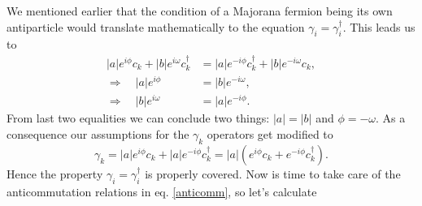 We mentioned earlier that the condition of a Majorana fermion being its own antiparticle would translate mathematically to the equation $\gamma_i = \gamma_i^\dagger$. This leads us to 
\begin{equation*}
    \begin{aligned}
     |a|e^{i\phi}c_k + |b|e^{i\omega}c_k^\dagger &= |a|e^{-i\phi}c_k^\dagger + |b|e^{-i\omega}c_k,\\
     \Rightarrow \quad|a|e^{i\phi} &= |b|e^{-i\omega},\\
     \Rightarrow \quad|b|e^{i\omega} &= |a|e^{-i\phi}.
    \end{aligned}
\end{equation*}
From last two equalities we can conclude two things: $|a| = |b|$ and $\phi = -\omega$. As a consequence our assumptions for the $\gamma_k$ operators get modified to 
$$\gamma_k = |a|e^{i\phi}c_k + |a|e^{-i\phi}c_k^\dagger = |a|(e^{i\phi}c_k + e^{-i\phi}c_k^\dagger).$$
Hence the property $\gamma_i = \gamma_i^\dagger$ is properly covered. Now is time to take care of the anticommutation relations in eq. \ref{anticomm}, so let's calculate\\

